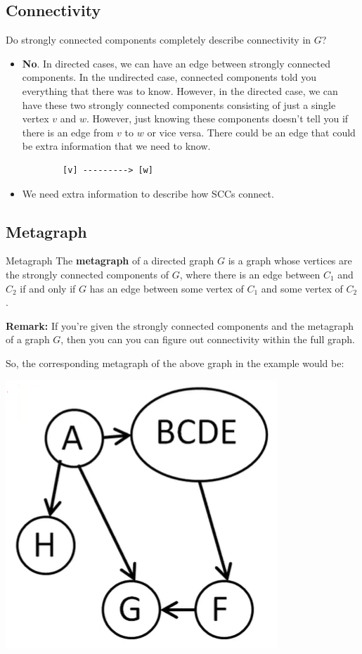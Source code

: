 \documentclass[letterpaper]{article}
\begin{document}
\subsection{Connectivity}
Do strongly connected components completely describe connectivity in $G$?
\begin{itemize}
    \item \textbf{No}. In directed cases, we can have an edge between strongly connected components. In the undirected case, connected components told you everything that there was to know. However, in the directed case, we can have these two strongly connected components consisting of just a single vertex $v$ and $w$. However, just knowing these components doesn't tell you if there is an edge from $v$ to $w$ or vice versa. There could be an edge that could be extra information that we need to know. 
    \begin{verbatim}
        [v] ---------> [w]
    \end{verbatim}

    \item We need extra information to describe how SCCs connect. 
\end{itemize}

\subsection{Metagraph}
\begin{definition}{Metagraph}{}
    The \textbf{metagraph} of a directed graph $G$ is a graph whose vertices are the strongly connected components of $G$, where there is an edge between $C_1$ and $C_2$ if and only if $G$ has an edge between some vertex of $C_1$ and some vertex of $C_2$. 
\end{definition}
\textbf{Remark:} If you're given the strongly connected components and the metagraph of a graph $G$, then you can you can figure out connectivity within the full graph.

\bigskip

So, the corresponding metagraph of the above graph in the example would be: 
\begin{center}
    \includegraphics[scale=0.6]{../assets/scc_meta.png}
\end{center}
\end{document}

